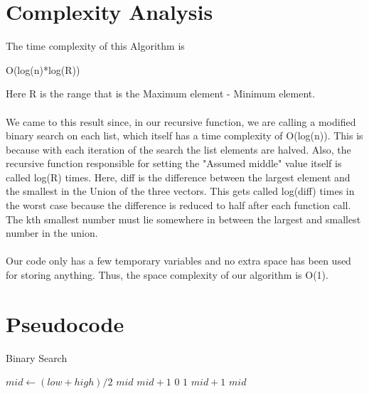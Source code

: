 \documentclass{article}
\begin{document}
\section{Complexity Analysis}
The time complexity of this Algorithm is
\begin{center}
O(log(n)*log(R))
\end{center}
Here R is the range that is the Maximum element - Minimum element.
\\\\We came to this result since, in our recursive function, we are calling a modified binary search on each list, which itself has a time complexity of O(log(n)). This is because with each iteration of the search the list elements are halved. Also, the recursive function responsible for setting the "Assumed middle" value itself is called log(R) times. Here, diff is the difference between the largest element and the smallest in the Union of the three vectors. This gets called log(diff) times in the worst case because the difference is reduced to half after each function call. The kth smallest number must lie somewhere in between the largest and smallest number in the union.
\\\\
Our code only has a few temporary variables and no extra space has been used for storing anything. Thus, the space complexity of our algorithm is O(1).

\section{Pseudocode}


\begin{algorithm}
\caption{Binary Search}
\begin{algorithmic}[1]
    \State $mid \gets (low + high) / 2$
            \State \Return $mid$
        \EndIf
        \State \Return $mid + 1$
            \State \Return $0$
        \Else
            \State \Return $1$
        \EndIf
            \State \Return $mid + 1$
        \EndIf
        \State \Return $mid$
        \State \Return {}
        \State \Return {}
    \EndIf
\EndFunction
\end{algorithmic}


\end{algorithm}
\end{document}
